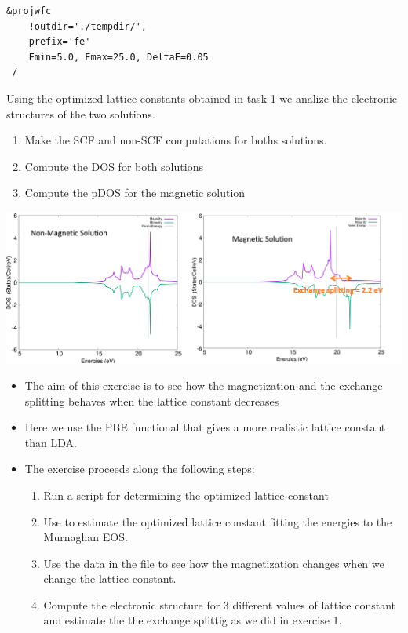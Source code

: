 \documentclass[landscape]{foils}
\begin{document}
\vfill 
\begin{minipage}{14cm}
  \begin{Verbatim}[frame=single, commandchars=\\\{\},fontsize=\small]
 &projwfc
    !outdir='./tempdir/',
    prefix='fe'
    Emin=5.0, Emax=25.0, DeltaE=0.05
 /
  \end{Verbatim}
\end{minipage}
Using the optimized lattice constants obtained in task 1 we analize the electronic 
structures of the  two solutions. 
\begin{enumerate}
  \item Make the SCF and non-SCF computations for boths solutions. 
  \item Compute the  DOS for both solutions
  \item Compute the pDOS for the magnetic solution
\end{enumerate}
\begin{center}
  \includegraphics[width=24cm]{figs/mag_non_mag_DOS.png}
\end{center}
\begin{itemize}
  \item The aim of this exercise is to see how the magnetization and the exchange splitting 
  behaves  when the lattice constant decreases 
  \item Here we use the PBE functional that gives a more realistic lattice constant than LDA. 
  \item The exercise proceeds along  the following steps:
    \begin{enumerate}
      \item Run a script for determining the optimized lattice constant
      \item Use  to estimate the optimized lattice constant fitting the energies
        to the Murnaghan EOS. 
      \item Use the data in the file  to see how the magnetization 
        changes when we change the lattice constant. 
      \item Compute the electronic structure for  3 different values of lattice constant and 
      estimate the the exchange splittig as we did in exercise 1. 
    \end{enumerate}
  \end{itemize} 
\end{document}
